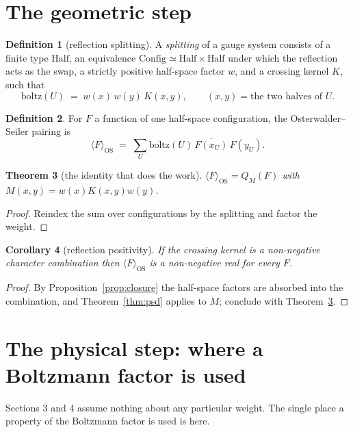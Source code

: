 \documentclass[11pt]{article}
\newtheorem{theorem}{Theorem}[section]
\newtheorem{corollary}[theorem]{Corollary}
\theoremstyle{definition}
\newtheorem{definition}[theorem]{Definition}
\begin{document}
\section{The geometric step}

\begin{definition}[reflection splitting]
A \emph{splitting} of a gauge system consists of a finite type
$\mathrm{Half}$, an equivalence $\mathrm{Config} \simeq \mathrm{Half} \times
\mathrm{Half}$ under which the reflection acts as the swap, a strictly positive
half-space factor $w$, and a crossing kernel $K$, such that
\[
  \mathrm{boltz}(U) \;=\; w(x)\,w(y)\,K(x,y),
  \qquad (x,y) = \text{the two halves of } U .
\]
\end{definition}

\begin{definition}
For $F$ a function of one half-space configuration, the
Osterwalder--Seiler pairing is
\[
  \langle F \rangle_{\mathrm{OS}} \;=\;
  \sum_U \mathrm{boltz}(U)\,\overline{F(x_U)}\,F(y_U).
\]
\end{definition}

\begin{theorem}[the identity that does the work]
\label{thm:identity}
$\langle F\rangle_{\mathrm{OS}} = Q_{M}(F)$ with $M(x,y) = w(x)K(x,y)w(y)$.
\end{theorem}

\begin{proof}
Reindex the sum over configurations by the splitting and factor the weight.
\end{proof}

\begin{corollary}[reflection positivity]
\label{cor:rp}
If the crossing kernel is a non-negative character combination then
$\langle F\rangle_{\mathrm{OS}}$ is a non-negative real for every $F$.
\end{corollary}

\begin{proof}
By Proposition~\ref{prop:closure} the half-space factors are absorbed into the
combination, and Theorem~\ref{thm:psd} applies to $M$; conclude with
Theorem~\ref{thm:identity}.
\end{proof}

\section{The physical step: where a Boltzmann factor is used}

Sections 3 and 4 assume nothing about any particular weight.  The single place
a property of the Boltzmann factor is used is here.
\end{document}
